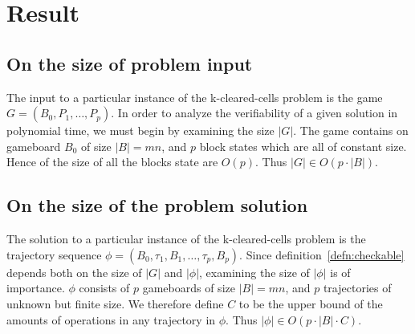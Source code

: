 \section{Result}

\subsection{On the size of problem input}
The input to a particular instance of the k-cleared-cells problem is the game $G = (B_0, P_1, \ldots, P_p)$. In order to analyze the verifiability of a given solution in polynomial time, we must begin by examining the size $|G|$. The game contains on gameboard $B_0$ of size $|B| = mn$, and $p$ block states which are all of constant size. Hence of the size of all the blocks state are $O(p)$. Thus $|G| \in O(p \cdot |B|)$.

\subsection{On the size of the problem solution}
The solution to a particular instance of the k-cleared-cells problem is the trajectory sequence $\phi=(B_0, \tau_1, B_1, \ldots ,\tau_p, B_p)$. Since definition~\ref{defn:checkable} depends both on the size of $|G|$ and $|\phi|$, examining the size of $|\phi|$ is of importance. $\phi$ consists of $p$ gameboards of size $|B| = mn$, and $p$ trajectories of unknown but finite size. We therefore define $C$ to be the upper bound of the amounts of operations in any trajectory in $\phi$. Thus $|\phi| \in O(p \cdot |B| \cdot C)$.




